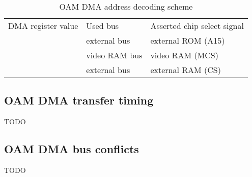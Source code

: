 \begin{table}[H]
  \caption{OAM DMA address decoding scheme}
  \rmfamily
  \begin{tabu} to \textwidth {|X[10,l]|X[5,l]|X[10,l]|}
    \everyrow{\hline}
    \hline
    DMA register value & Used bus      & Asserted chip select signal \\
      & external bus  & external ROM (A15)          \\
      & video RAM bus & video RAM (MCS)             \\
      & external bus  & external RAM (CS)
  \end{tabu}
\end{table}

\subsection{OAM DMA transfer timing}

TODO

\subsection{OAM DMA bus conflicts}

TODO
